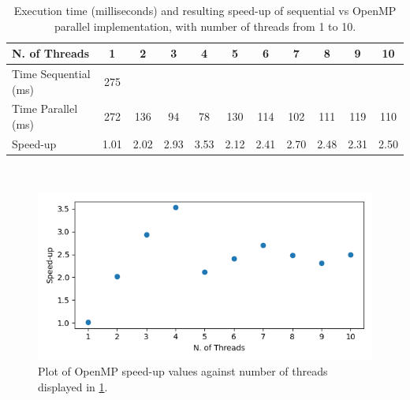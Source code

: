 \documentclass[10pt,twocolumn,letterpaper]{article}
\begin{document}
\begin{table}[h]
	\centering
	\begin{tabular}{|l|c|c|c|c|c|c|c|c|c|c|}
		\hline
		N. of Threads        & 1    & 2    & 3    & 4    & 5    & 6    & 7    & 8    & 9    & 10   \\ \hline
		Time Sequential (ms) & 275  &      &      &      &      &      &      &      &      &      \\ \hline
		Time Parallel (ms)   & 272  & 136  & 94   & 78   & 130  & 114  & 102  & 111  & 119  & 110  \\ \hline
		Speed-up             & 1.01 & 2.02 & 2.93 & 3.53 & 2.12 & 2.41 & 2.70 & 2.48 & 2.31 & 2.50 \\ \hline
	\end{tabular}\\
	\bigskip
	\caption{Execution time (milliseconds) and resulting speed-up of sequential vs OpenMP parallel implementation, with number of threads from 1 to 10.}
	\label{table:speedup}
\end{table}
\begin{figure}[h]
	\begin{center}
		\includegraphics[width=\textwidth]{img/speedup_OMP.png}
	\end{center}
	\caption{Plot of OpenMP speed-up values against number of threads displayed in \cref{table:speedup}.}
	\label{fig:speedup}
\end{figure}
\end{document}
